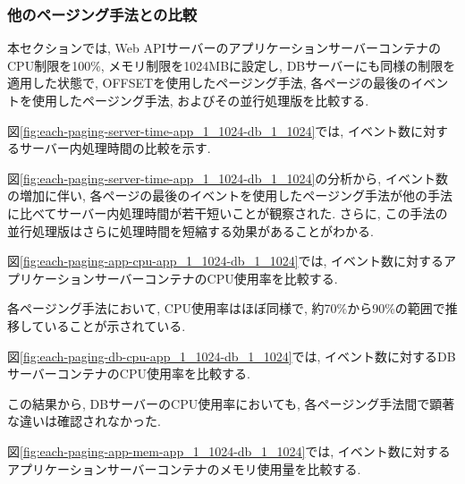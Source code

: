\documentclass[../../../../main]{subfiles}
\begin{document}
    \subsubsection{他のページング手法との比較}\label{subsubsec:result-each-paging-only-limit}

    本セクションでは, Web APIサーバーのアプリケーションサーバーコンテナのCPU制限を100\%, メモリ制限を1024MBに設定し, DBサーバーにも同様の制限を適用した状態で, OFFSETを使用したページング手法, 各ページの最後のイベントを使用したページング手法, およびその並行処理版を比較する.

    \label{subsubsubsec:result-each-paging-only-limit-server-time}

    図\ref{fig:each-paging-server-time-app_1_1024-db_1_1024}では, イベント数に対するサーバー内処理時間の比較を示す.

    

    図\ref{fig:each-paging-server-time-app_1_1024-db_1_1024}の分析から, イベント数の増加に伴い, 各ページの最後のイベントを使用したページング手法が他の手法に比べてサーバー内処理時間が若干短いことが観察された. さらに, この手法の並行処理版はさらに処理時間を短縮する効果があることがわかる.

    \label{subsubsubsec:result-each-paging-only-limit-cpu}

    図\ref{fig:each-paging-app-cpu-app_1_1024-db_1_1024}では, イベント数に対するアプリケーションサーバーコンテナのCPU使用率を比較する.

    

    各ページング手法において, CPU使用率はほぼ同様で, 約70\%から90\%の範囲で推移していることが示されている.

    図\ref{fig:each-paging-db-cpu-app_1_1024-db_1_1024}では, イベント数に対するDBサーバーコンテナのCPU使用率を比較する.

    

    この結果から, DBサーバーのCPU使用率においても, 各ページング手法間で顕著な違いは確認されなかった.

    \label{subsubsubsec:result-each-paging-only-limit-mem}

    図\ref{fig:each-paging-app-mem-app_1_1024-db_1_1024}では, イベント数に対するアプリケーションサーバーコンテナのメモリ使用量を比較する.
\end{document}
